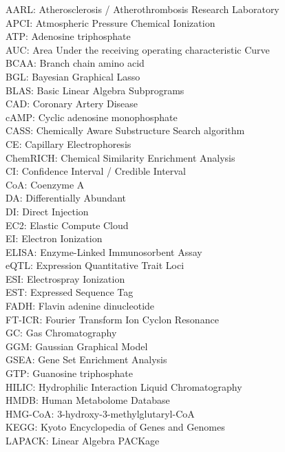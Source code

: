 \noindent
AARL: Atherosclerosis / Atherothrombosis Research Laboratory \\
APCI: Atmospheric Pressure Chemical Ionization \\
ATP: Adenosine triphosphate \\
AUC: Area Under the receiving operating characteristic Curve \\
BCAA: Branch chain amino acid \\
BGL: Bayesian Graphical Lasso \\
BLAS: Basic Linear Algebra Subprograms \\
CAD: Coronary Artery Disease \\
cAMP: Cyclic adenosine monophosphate \\
CASS: Chemically Aware Substructure Search algorithm \\
CE: Capillary Electrophoresis \\
ChemRICH: Chemical Similarity Enrichment Analysis \\
CI: Confidence Interval / Credible Interval  \\
CoA: Coenzyme A \\
DA: Differentially Abundant  \\
DI: Direct Injection \\
EC2: Elastic Compute Cloud \\
EI: Electron Ionization  \\
ELISA: Enzyme-Linked Immunosorbent Assay \\
eQTL: Expression Quantitative Trait Loci \\
ESI: Electrospray Ionization  \\
EST: Expressed Sequence Tag \\
FADH: Flavin adenine dinucleotide \\
FT-ICR: Fourier Transform Ion Cyclon Resonance  \\
GC: Gas Chromatography  \\
GGM: Gaussian Graphical Model \\
GSEA: Gene Set Enrichment Analysis \\
GTP: Guanosine triphosphate \\
HILIC: Hydrophilic Interaction Liquid Chromatography  \\
HMDB: Human Metabolome Database \\
HMG-CoA: 3-hydroxy-3-methylglutaryl-CoA \\
KEGG: Kyoto Encyclopedia of Genes and Genomes \\
LAPACK: Linear Algebra PACKage \\
